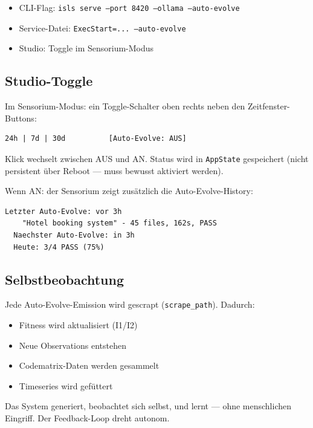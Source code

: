 \documentclass[11pt,a4paper]{article}
\begin{document}
\begin{itemize}[nosep]
\item CLI-Flag: \texttt{isls serve --port 8420 --ollama --auto-evolve}
\item Service-Datei: 
      \texttt{ExecStart=... --auto-evolve}
\item Studio: Toggle im Sensorium-Modus
\end{itemize}

\subsection{Studio-Toggle}

Im Sensorium-Modus: ein Toggle-Schalter oben rechts neben 
den Zeitfenster-Buttons:

\begin{lstlisting}[style=bash]
  24h | 7d | 30d          [Auto-Evolve: AUS]
\end{lstlisting}

Klick wechselt zwischen AUS und AN. Status wird in 
\texttt{AppState} gespeichert (nicht persistent \"uber 
Reboot --- muss bewusst aktiviert werden).

Wenn AN: der Sensorium zeigt zus\"atzlich die 
Auto-Evolve-History:

\begin{lstlisting}[style=bash]
  Letzter Auto-Evolve: vor 3h
    "Hotel booking system" - 45 files, 162s, PASS
  Naechster Auto-Evolve: in 3h
  Heute: 3/4 PASS (75%)
\end{lstlisting}

\subsection{Selbstbeobachtung}

Jede Auto-Evolve-Emission wird gescrapt (\texttt{scrape\_path}). 
Dadurch:
\begin{itemize}[nosep]
\item Fitness wird aktualisiert (I1/I2)
\item Neue Observations entstehen
\item Codematrix-Daten werden gesammelt
\item Timeseries wird gef\"uttert
\end{itemize}

Das System generiert, beobachtet sich selbst, und lernt --- 
ohne menschlichen Eingriff. Der Feedback-Loop dreht autonom.


\end{document}
